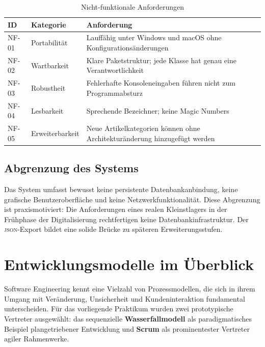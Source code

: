 \documentclass[12pt, a4paper, twoside]{report}
\newcommand{\json}{\textsc{json}}
\begin{document}
\begin{table}[H]
  \centering
  \caption{Nicht-funktionale Anforderungen}
  \label{tab:nfanforderungen}
  \begin{tabularx}{\textwidth}{L{1cm} L{3.5cm} L{8.5cm}}
    \toprule
    \textbf{ID} & \textbf{Kategorie} & \textbf{Anforderung} \\
    \midrule
    NF-01 & Portabilität   & Lauffähig unter Windows und macOS ohne Konfigurationsänderungen \\
    NF-02 & Wartbarkeit    & Klare Paketstruktur; jede Klasse hat genau eine Verantwortlichkeit \\
    NF-03 & Robustheit     & Fehlerhafte Konsoleneingaben führen nicht zum Programmabsturz \\
    NF-04 & Lesbarkeit     & Sprechende Bezeichner; keine Magic Numbers \\
    NF-05 & Erweiterbarkeit & Neue Artikelkategorien können ohne Architekturänderung hinzugefügt werden \\
    \bottomrule
  \end{tabularx}
\end{table}

\section{Abgrenzung des Systems}

Das System umfasst bewusst keine persistente Datenbankanbindung, keine grafische
Benutzeroberfläche und keine Netzwerkfunktionalität. Diese Abgrenzung ist praxismotiviert:
Die Anforderungen eines realen Kleinstlagers in der Frühphase der Digitalisierung rechtfertigen
keine Datenbankinfrastruktur. Der \json{}-Export bildet eine solide Brücke zu späteren
Erweiterungsstufen.

\chapter{Entwicklungsmodelle im Überblick}
\label{chap:entwicklungsmodelle}

Software Engineering kennt eine Vielzahl von Prozessmodellen, die sich in ihrem Umgang mit
Veränderung, Unsicherheit und Kundeninteraktion fundamental unterscheiden. Für das vorliegende
Praktikum wurden zwei prototypische Vertreter ausgewählt: das sequenzielle \textbf{Wasserfallmodell}
als paradigmatisches Beispiel plangetriebener Entwicklung und \textbf{Scrum} als prominentester
Vertreter agiler Rahmenwerke.
\end{document}
